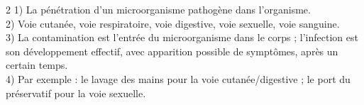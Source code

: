 \begin{multicols}{2}
1) La pénétration d'un microorganisme pathogène dans l'organisme.\\
2) Voie cutanée, voie respiratoire, voie digestive, voie sexuelle, voie sanguine.\\
3) La contamination est l'entrée du microorganisme dans le corps ; l'infection est son
développement effectif, avec apparition possible de symptômes, après un certain
temps.\\
4) Par exemple : le lavage des mains pour la voie cutanée/digestive ; le port du
préservatif pour la voie sexuelle.

\end{multicols}
\exercicesBanner
